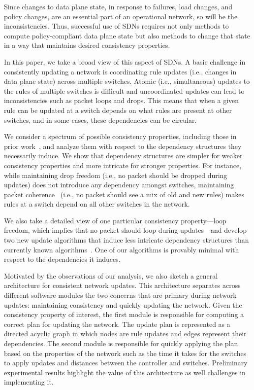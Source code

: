 Since changes to data plane state, in response to failures, load changes, and policy changes, are an essential part of an operational network, so will be the inconsistencies. Thus, successful use of SDNs requires not only methods to compute policy-compliant data plane state but also methods to change that state in a way that maintains desired consistency properties.


In this paper, we take a broad view of this aspect of SDNs. A basic challenge in consistently updating a network is coordinating rule updates (i.e., changes in data plane state) across multiple switches.  Atomic (i.e., simultaneous) updates to the rules of multiple switches is difficult and uncoordinated updates can lead to inconsistencies such as packet loops and drops. This means that when a given rule can be updated at a switch depends on what rules are present at other switches, and in some cases, these dependencies can be circular.

We consider a spectrum of possible consistency properties, including those in prior work~\cite{safeupdate,swan}, and analyze them with respect to the dependency structures they necessarily induce.
We show that dependency structures are simpler for weaker consistency properties and more intricate for stronger properties.  For instance, while maintaining drop freedom (i.e., no packet should be dropped during updates) does not introduce any dependency amongst switches, maintaining packet coherence~\cite{safeupdates} (i.e., no packet should see a mix of old and new rules) makes rules at a switch depend on all other switches in the network.

We also take a detailed view of one particular consistency property---loop freedom, which implies that  no packet should loop during updates---and develop two new update algorithms that induce less intricate dependency structures than currently known algorithms~\cite{safeupdate}. One of our algorithms is provably minimal with respect to the dependencies it induces.

Motivated by the observations of our analysis, we also sketch a general architecture for consistent network updates. This architecture separates across different software modules the two concerns that are primary during network updates: maintaining  consistency and quickly updating the network. Given the consistency property of interest, the first module is responsible for computing a correct plan for updating the network. The update plan is represented as a directed acyclic graph in which nodes are rule updates and edges represent their dependencies.  The second module is responsible for quickly applying the plan based on the properties of the network such as the time it takes for the switches to apply updates and distances between the controller and switches. Preliminary experimental results highlight the value of this architecture as well challenges in implementing it.
